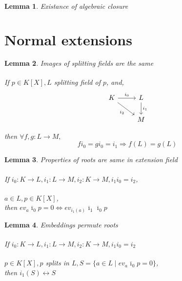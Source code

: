 \documentclass{article}
\theoremstyle{definitionstyle}
\theoremstyle{lemmastyle}
\newtheorem{lem}{Lemma}[section]
\theoremstyle{remark}
\newcommand{\ibar}{\overline{\imath}}
\begin{document}
\begin{lem} Existance of algebraic closure \end{lem}

\section{Normal extensions}

\begin{lem} Images of splitting fields are the same\\
\\
If $p \in K[X], L$ splitting field of $p$, and,
\begin{equation} \begin{tikzcd}
K \ar[r, "i_0"] \ar[rd, "i_2", swap] 	& L \ar[d, "i_1"] \\
						& M 
\end{tikzcd} \end{equation} 

then $\forall f, g : L \to M,$ \[f i_0 = g i_0 = i_1 \Rightarrow f(L) = g(L)\]\end{lem}

\begin{lem} Properties of roots are same in extension field\\
\\
If $i_0 : K \to L, i_1 : L \to M, i_2 : K \to M, i_1 i_0 = i_2$,\\
\\
$a \in L, p \in K[X]$,\\

then $ev_a \ibar_0 p = 0 \iff ev_{i_1 (a)} \ibar_1 \ibar_0 p$ \end{lem}

\begin{lem} Embeddings permute roots\\
\\
If $i_0 : K \to L, i_1 : L \to M, i_2 : K \to M, i_1 i_0 = i_2$\\
\\
$p \in K[X], p$ splits in $L, S = \{a \in L \mid ev_a \ibar_0 p = 0\}$,\\

then $i_1(S) \leftrightarrow S$ \end{lem}
\end{document}
